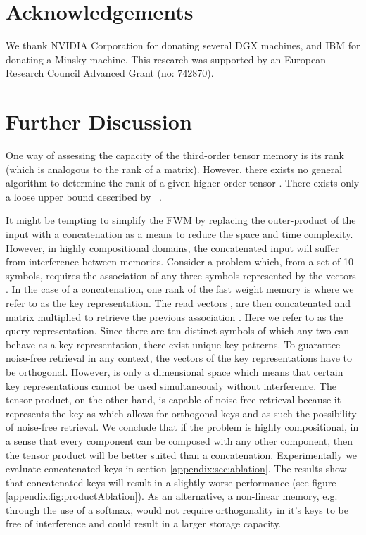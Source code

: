 \documentclass{article} \usepackage{iclr2021_conference,times}
\newcommand\StartAppendixEntries{}
\newcommand*\appendixwithtoc{\cleardoublepage
  \appendix
  \addtocontents{toc}{\protect\StartAppendixEntries}
  \listofatoc
}
\begin{document}
\section*{Acknowledgements}
We thank NVIDIA Corporation for donating several DGX
machines, and IBM for donating a Minsky machine.
This research was supported by an European
Research Council Advanced Grant (no: 742870).





\appendixwithtoc
\newpage

\section{Further Discussion}
\label{appendix:sec:discussion}
One way of assessing the capacity of the third-order tensor memory is its rank (which is analogous to the rank of a matrix). 
However, there exists no general algorithm to determine the rank of a given higher-order tensor . There exists only a loose upper bound described by ~\citep{kruskal1989rank,kolda2009tensor}.

It might be tempting to simplify the FWM by replacing the outer-product of the input with a concatenation as a means to reduce the space and time complexity. 
However, in highly compositional domains, the concatenated input will suffer from interference between memories.
Consider a problem which, from a set of 10 symbols, requires the association of any three symbols represented by the vectors . 
In the case of a concatenation, one rank of the fast weight memory is  where we refer to  as the key representation. 
The read vectors , are then concatenated and matrix multiplied to retrieve the previous association . 
Here we refer to  as the query representation. 
Since there are ten distinct symbols of which any two can behave as a key representation, there exist  unique key patterns. 
To guarantee noise-free retrieval in any context, the vectors of the key representations have to be orthogonal. 
However,  is only a  dimensional space which means that certain key representations cannot be used simultaneously without interference.
The tensor product, on the other hand, is capable of noise-free retrieval because it represents the key as  which allows for  orthogonal keys and as such the possibility of noise-free retrieval.
We conclude that if the problem is highly compositional, in a sense that every component can be composed with any other component, then the tensor product will be better suited than a concatenation. Experimentally we evaluate concatenated keys in section \ref{appendix:sec:ablation}. The results show that concatenated keys will result in a slightly worse performance (see figure \ref{appendix:fig:productAblation}). As an alternative, a non-linear memory, e.g. through the use of a softmax, would not require orthogonality in it's keys to be free of interference and could result in a larger storage capacity.
\end{document}
